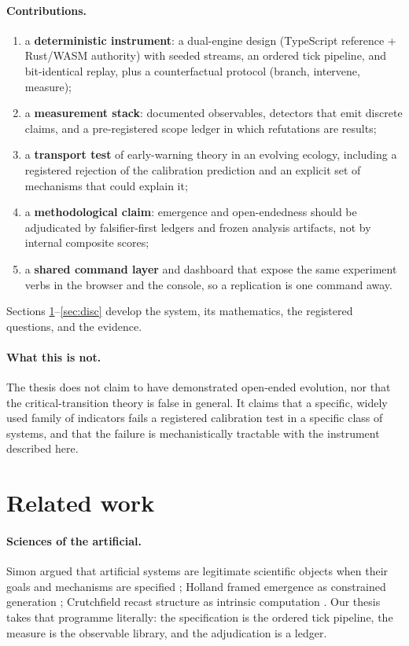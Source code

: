 \documentclass[11pt,a4paper]{article}
\begin{document}
\paragraph{Contributions.}
\begin{enumerate}\setlength\itemsep{1pt}
\item a \textbf{deterministic instrument}: a dual-engine design (TypeScript
reference + Rust/WASM authority) with seeded streams, an ordered tick pipeline,
and bit-identical replay, plus a counterfactual protocol (branch, intervene,
measure);
\item a \textbf{measurement stack}: documented observables, detectors that emit
discrete claims, and a pre-registered scope ledger in which refutations are
results;
\item a \textbf{transport test} of early-warning theory in an evolving ecology,
including a registered rejection of the calibration prediction and an explicit
set of mechanisms that could explain it;
\item a \textbf{methodological claim}: emergence and open-endedness should be
adjudicated by falsifier-first ledgers and frozen analysis artifacts, not by
internal composite scores;
\item a \textbf{shared command layer} and dashboard that expose the same
experiment verbs in the browser and the console, so a replication is one
command away.
\end{enumerate}
Sections \ref{sec:related}--\ref{sec:disc} develop the system, its
mathematics, the registered questions, and the evidence.

\paragraph{What this is not.} The thesis does not claim to have demonstrated
open-ended evolution, nor that the critical-transition theory is false in
general. It claims that a specific, widely used family of indicators fails a
registered calibration test in a specific class of systems, and that the
failure is mechanistically tractable with the instrument described here.

\section{Related work}\label{sec:related}
\paragraph{Sciences of the artificial.} Simon argued that artificial systems are
legitimate scientific objects when their goals and mechanisms are specified
\citep{simon1962}; Holland framed emergence as constrained generation
\citep{holland1995}; Crutchfield recast structure as intrinsic computation
\citep{crutchfield1994}. Our thesis takes that programme literally: the
specification is the ordered tick pipeline, the measure is the observable
library, and the adjudication is a ledger.
\end{document}
